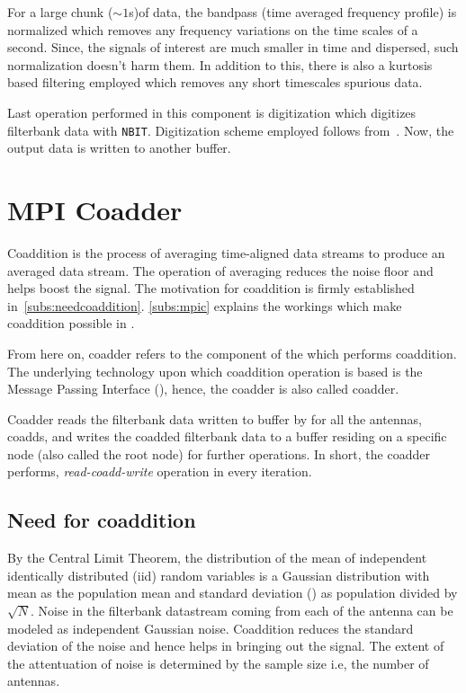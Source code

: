 \par For a large chunk ($\sim 1$s)of data, the bandpass (time averaged frequency profile) is normalized which removes any frequency variations on the time scales of a second. Since, the signals of interest are much smaller in time and dispersed, such normalization doesn't harm them. In addition to this, there is also a kurtosis based filtering employed which removes any short timescales spurious data.

\par Last operation performed in this component is digitization which digitizes filterbank data with \texttt{NBIT}. Digitization scheme employed follows from~\cite{jenetanderson}. Now, the output data is written to another \dada buffer.

\section {MPI Coadder}

\par Coaddition is the process of averaging time-aligned data streams to produce an averaged data stream. The operation of averaging reduces the noise floor and helps boost the signal.
The motivation for coaddition is firmly established in~\autoref{subs:needcoaddition}. 
\autoref{subs:mpic} explains the workings which make coaddition possible in \vf. 

\par From here on, coadder refers to the component of the \vf which performs coaddition. The underlying technology upon which coaddition operation is based is the Message Passing Interface (\mpi), hence, the coadder is also called \mpi coadder.

\par Coadder reads the filterbank data written to \dada buffer by \pb for all the antennas, coadds, and writes the coadded filterbank data to a \dada buffer residing on a specific node (also called the root node) for further operations. 
In short, the coadder performs, \emph{read-coadd-write} operation in every iteration.

\subsection {Need for coaddition}
\label{ssub:needcoaddition}
\par By the Central Limit Theorem, the distribution of the mean of independent identically distributed (iid) random variables is a Gaussian distribution with mean as the population mean and standard deviation (\sd) as population \sd divided by $\sqrt{N}$.
Noise in the filterbank datastream coming from each of the antenna can be modeled as independent Gaussian noise.
Coaddition reduces the standard deviation of the noise and hence helps in bringing out the signal.
The extent of the attentuation of noise is determined by the sample size i.e, the number of antennas.

